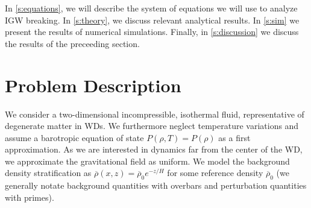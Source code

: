 \documentclass[
        fleqn,
        usenatbib,
    ]{mnras}
\begin{document}




In \autoref{s:equations}, we will describe the system of equations we will
use to analyze IGW breaking. In \autoref{s:theory}, we discuss relevant
analytical results. In \autoref{s:sim} we present the results of numerical
simulations. Finally, in \autoref{s:discussion} we discuss the results of the
preceeding section.

\section{Problem Description}\label{s:equations}

We consider a two-dimensional incompressible, isothermal fluid, representative
of degenerate matter in WDs. We furthermore neglect temperature variations and
assume a barotropic equation of state $P(\rho, T) = P(\rho)$ as a first
approximation. As we are interested in dynamics far from the center of the WD,
we approximate the gravitational field as uniform. We model the background
density stratification as $\overline{\rho}(x, z) = \overline{\rho}_0 e^{-z/H}$
for some reference density $\overline{\rho}_0$ (we generally notate background
quantities with overbars and perturbation quantities with primes).
\end{document}
